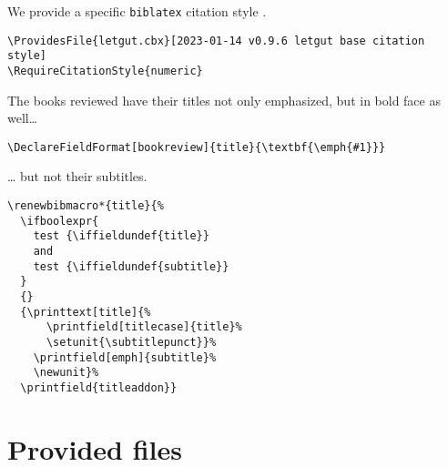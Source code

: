 \documentclass{letgut}
\begin{document}
We provide a specific \lstinline+biblatex+ citation style .

\begin{lstlisting}
\ProvidesFile{letgut.cbx}[2023-01-14 v0.9.6 letgut base citation style]
\RequireCitationStyle{numeric}
\end{lstlisting}

The books reviewed have their titles not only emphasized, but in bold face as
well\ldots{}

\begin{lstlisting}
\DeclareFieldFormat[bookreview]{title}{\textbf{\emph{#1}}}
\end{lstlisting}

\ldots{} but not their subtitles.

\begin{lstlisting}
\renewbibmacro*{title}{%
  \ifboolexpr{
    test {\iffieldundef{title}}
    and
    test {\iffieldundef{subtitle}}
  }
  {}
  {\printtext[title]{%
      \printfield[titlecase]{title}%
      \setunit{\subtitlepunct}}%
    \printfield[emph]{subtitle}%
    \newunit}%
  \printfield{titleaddon}}
\end{lstlisting}

\section{Provided files}
\label{Providedfiles-g09h55h0jlj0}
\end{document}
